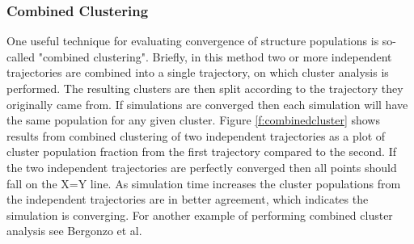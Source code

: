 \subsubsection{Combined Clustering}
One useful technique for evaluating convergence of structure populations is so-called "combined clustering". Briefly, in this method two or more independent trajectories are combined into a single trajectory, on which cluster analysis is performed. The resulting clusters are then split according to the trajectory they originally came from. If simulations are converged then each simulation will have the same population for any given cluster. Figure \ref{f:combinedcluster} shows results from combined clustering of two independent trajectories as a plot of cluster population fraction from the first trajectory compared to the second. If the two independent trajectories are perfectly converged then all points should fall on the X=Y line. As simulation time increases the cluster populations from the independent trajectories are in better agreement, which indicates the simulation is converging. For another example of performing combined cluster analysis see Bergonzo et al.\citep{Bergonzo2014}